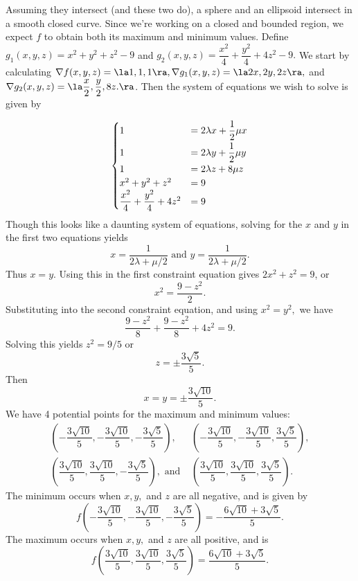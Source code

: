 {Assuming they intersect (and these two do), a sphere and an ellipsoid intersect in a smooth closed curve.  Since we're working on a closed and bounded region, we expect $f$ to obtain both its maximum and minimum values.  Define $g_1(x,y,z) = x^2 + y^2 + z^2 -  9$ and $g_2(x,y,z) = \dfrac{x^2}{4} + \dfrac{y^2}{4} + 4z^2 - 9.$ We start by calculating $\nabla f(x,y,z) = \la 1,1,1 \ra, \nabla g_1(x,y,z) = \la 2x,2y,2z\ra,$ and $\nabla g_2(x,y,z) = \la \dfrac{x}{2}, \dfrac{y}{2}, 8z. \ra$.  Then the system of equations we wish to solve is given by

\[
		\begin{cases}
			                                     1 & = 2\lambda x + \dfrac{1}{2}\mu x \smallskip \\
			                                     1 & = 2\lambda y + \dfrac{1}{2}\mu y  \\
			                                     1 & =2\lambda z + 8\mu z            \\
			                       x^2 + y^2 + z^2 & = 9                             \\
			\dfrac{x^2}{4} + \dfrac{y^2}{4} + 4z^2 & = 9
		\end{cases}\]
Though this looks like a daunting system of equations, solving for the $x$ and $y$ in the first two equations yields 
\[
	x = \dfrac{1}{2\lambda + \mu/2} \text{ and } y = \dfrac{1}{2\lambda + \mu/2}.
\] 
Thus $x = y$.  Using this in the first constraint equation gives $2x^2 + z^2 = 9$, or
\[
	x^2 = \dfrac{9 - z^2}{2}.
\] 
Substituting into the second constraint equation, and using $x^2 = y^2,$ we have 
\[
	\dfrac{9 - z^2}{8} + \dfrac{9 - z^2}{8} + 4z^2 = 9.
\]
Solving this yields $z^2 = 9/5$ or
\[
	z =\pm \dfrac{3 \sqrt{5}}{5}.
\]
Then
\[
x = y = \pm \dfrac{3\sqrt{10}}{5}.
\]
We have 4 potential points for the maximum and minimum values:
	\[\begin{array}{ll}
	\left(- \dfrac{3\sqrt{10}}{5},-\dfrac{3\sqrt{10}}{5}, -\dfrac{3 \sqrt{5}}{5}\right), & \left(- \dfrac{3\sqrt{10}}{5},-\dfrac{3\sqrt{10}}{5}, \dfrac{3 \sqrt{5}}{5}\right), \\
	\left( \dfrac{3\sqrt{10}}{5},\dfrac{3\sqrt{10}}{5}, -\dfrac{3 \sqrt{5}}{5}\right),  \text{ and } &\left( \dfrac{3\sqrt{10}}{5},\dfrac{3\sqrt{10}}{5}, \dfrac{3 \sqrt{5}}{5}\right). \end{array}
	\]
The minimum occurs when $x, y,$ and $z$ are all negative, and is given by $$f\left(- \dfrac{3\sqrt{10}}{5},-\dfrac{3\sqrt{10}}{5}, -\dfrac{3 \sqrt{5}}{5}\right) = -\dfrac{6\sqrt{10} + 3\sqrt{5}}{5}.$$  The maximum occurs when $x,y,$ and $z$ are all positive, and is $$f\left( \dfrac{3\sqrt{10}}{5},\dfrac{3\sqrt{10}}{5}, \dfrac{3 \sqrt{5}}{5}\right) = \dfrac{6\sqrt{10} + 3\sqrt{5}}{5}.$$
}

